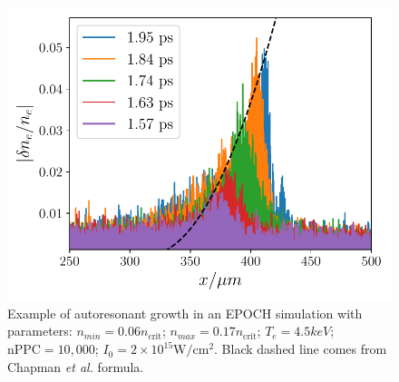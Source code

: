 \begin{figure}[ht]
    \centering
    \includegraphics[width=0.8\columnwidth]{Chapters/C2_Theory/AR_diagnostic.pdf}
    \caption{Example of autoresonant growth in an EPOCH simulation with parameters: $n_{min} = 0.06 n_{\text{crit}}$; $n_{max} = 0.17 n_{\text{crit}}$; $T_e = 4.5\si{keV}$; $\text{nPPC}=10,000$; $I_0 = 2 \times 10^{15}\si{\watt / \centi\metre^2}$. Black dashed line comes from Chapman \textit{et al.} \citep{Chapman2012} formula.}
    \label{fig:AR_diagnostic}
\end{figure}{}

%
%

